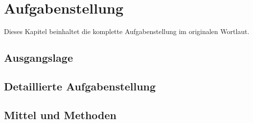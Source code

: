 \chapter{Aufgabenstellung}

Dieses Kapitel beinhaltet die komplette Aufgabenstellung im originalen Wortlaut.

\section{Ausgangslage}

\lipsum[1-2]

\section{Detaillierte Aufgabenstellung}

\lipsum[3-9]

\section{Mittel und Methoden}
\lipsum[10]